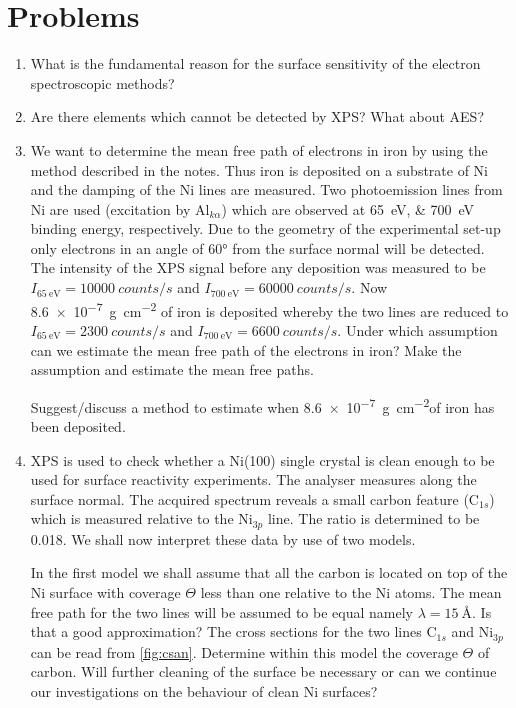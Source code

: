 \section{Problems}
\begin{enumerate}
\item What is the fundamental reason for the surface sensitivity of the electron spectroscopic methods?

\item Are there elements which cannot be detected by XPS? What about AES?

\item We want to determine the mean free path of electrons in iron by using the method described in the notes. Thus iron is deposited on a substrate of Ni and the damping of the Ni lines are measured. Two photoemission lines from Ni are used (excitation by Al$_{k\alpha}$) which are observed at \SIlist{65;700}{\electronvolt} binding energy, respectively. Due to the geometry of the experimental set-up only electrons in an angle of \ang{60} from the surface normal will be detected. The intensity of the XPS signal before any deposition was measured to be $I_{\SI{65}{\electronvolt}}=\SI{10000}{counts\per s}$ and $I_{\SI{700}{\electronvolt}}=\SI{60000}{counts\per s}$. Now \SI{8.6e-7}{g\per cm^2} of iron is deposited whereby the two lines are reduced to $I_{\SI{65}{\electronvolt}}=\SI{2300}{counts\per s}$ and $I_{\SI{700}{\electronvolt}}=\SI{6600}{counts\per s}$. Under which assumption can we estimate the mean free path of the electrons in iron? Make the assumption and estimate the mean free paths.

Suggest/discuss a method to estimate when \SI{8.6e-7}{g\per cm^2}of iron has been deposited.

\item XPS is used to check whether a Ni(100) single crystal is clean enough to be used for surface reactivity experiments. The analyser measures along the surface normal. The acquired spectrum reveals a small carbon feature (C$_{1s}$) which is measured relative to the Ni$_{3p}$ line. The ratio is determined to be 0.018. We shall now interpret these data by use of two models.

In the first model we shall assume that all the carbon is located on top of the Ni surface with coverage $\Theta$ less than one relative to the Ni atoms. The mean free path for the two lines will be assumed to be equal namely $\lambda=\SI{15}{\angstrom}$. Is that a good approximation? The cross sections for the two lines C$_{1s}$ and Ni$_{3p}$ can be read from \autoref{fig:csan}. Determine within this model the coverage $\Theta$ of carbon. Will further cleaning of the surface be necessary or can we continue our investigations on the behaviour of clean Ni surfaces?


\end{enumerate}
